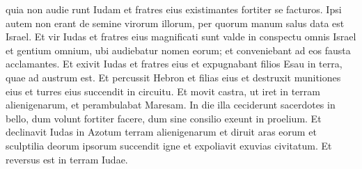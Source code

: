 \begin{biblechapter}
\begin{biblechapter}
\begin{biblechapter}
\begin{biblechapter}
\begin{biblechapter}
\verse quia non audie runt Iudam et fratres eius existimantes fortiter se facturos. 
\verse Ipsi autem non erant de semine virorum illorum, per quorum manum salus data est Israel.
 \verse Et vir Iudas et fratres eius magnificati sunt valde in conspectu omnis Israel et gentium omnium, ubi audiebatur nomen eorum; 
\verse et conveniebant ad eos fausta acclamantes. 
\verse Et exivit Iudas et fratres eius et expugnabant filios Esau in terra, quae ad austrum est. Et percussit Hebron et filias eius et destruxit munitiones eius et turres eius succendit in circuitu. 
\verse Et movit castra, ut iret in terram alienigenarum, et perambulabat Maresam. 
\verse In die illa ceciderunt sacerdotes in bello, dum volunt fortiter facere, dum sine consilio exeunt in proelium. 
\verse Et declinavit Iudas in Azotum terram alienigenarum et diruit aras eorum et sculptilia deorum ipsorum succendit igne et expoliavit exuvias civitatum. Et reversus est in terram Iudae.
 

\end{biblechapter}
\end{biblechapter}
\end{biblechapter}
\end{biblechapter}
\end{biblechapter}
